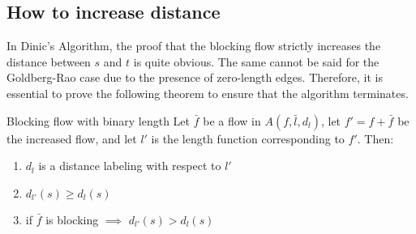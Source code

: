 \subsection{How to increase distance}
In Dinic's Algorithm, the proof that the blocking flow strictly increases the distance between $s$ and $t$ is quite obvious.
The same cannot be said for the Goldberg-Rao case due to the presence of zero-length edges. Therefore, it is essential to prove the following theorem to ensure that the algorithm terminates.
\begin{theorem}{Blocking flow with binary length}{}
Let $\bar{f}$ be a flow in $A(f,\bar{l}, d_l)$, let $f' = f + \bar{f}$ be the increased flow, and let 
    $l'$ is the length function corresponding to $f'$.
Then:
    \begin{enumerate}
        \item $d_l$ is a distance labeling with respect to $l'$
        \item $d_{l'}(s) \ge d_l(s)$
        \item if $\bar{f}$ is blocking $\implies$ $d_{l'}(s) > d_l(s)$
    \end{enumerate}
\end{theorem}
